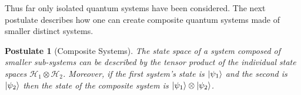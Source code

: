 \documentclass[../../dissertation.tex]{subfiles}
\newtheorem{post}{Postulate}
\begin{document}
Thus far only isolated quantum systems have been considered. The next postulate
describes how one can create composite quantum systems made of smaller distinct
systems.
\begin{post}[Composite Systems]
	The state space of a system composed of smaller sub-systems can be
	described by the tensor product of the individual state spaces
	$\mathcal{H_1}\otimes\mathcal{H_2}$. Moreover, if the first system's
	state is $\ket{\psi_1}$ and the second is $\ket{\psi_2}$ then the state
	of the composite system is $\ket{\psi_1} \otimes \ket{\psi_2}$.  
\end{post}
\end{document}
